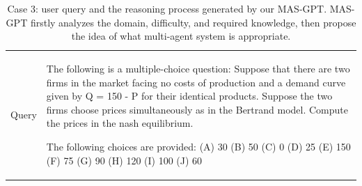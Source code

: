 \documentclass{article}
\theoremstyle{plain}
\theoremstyle{definition}
\theoremstyle{remark}
\begin{document}
\begin{table}[h!]
    \centering
    \caption{Case 3: user query and the reasoning process generated by our MAS-GPT. MAS-GPT firstly analyzes the domain, difficulty, and required knowledge, then propose the idea of what multi-agent system is appropriate.}
    \begin{tabular}{p{1.8cm}|p{14cm}}
    \toprule
        Query & The following is a multiple-choice question:
Suppose that there are two firms in the market facing no costs of production and a demand curve given by Q = 150 - P for their identical products. Suppose the two firms choose prices simultaneously as in the Bertrand model. Compute the prices in the nash equilibrium. \newline \newline

The following choices are provided:\newline
(A) 30\newline
(B) 50\newline
(C) 0\newline
(D) 25\newline
(E) 150\newline
(F) 75\newline
(G) 90\newline
(H) 120\newline
(I) 100\newline
(J) 60\newline \newline


\end{tabular}
\end{table}
\end{document}
